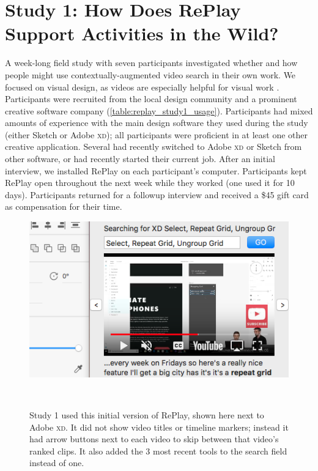 \section{Study 1: How Does RePlay Support Activities in the Wild?}

A week-long field study with seven participants investigated whether and how people might use contextually-augmented video search in their own work. We focused on visual design, as videos are especially helpful for visual work \cite{Chi2012}.  Participants were recruited from the local design community and a prominent creative software company (\autoref{table:replay_study1_usage}). Participants had mixed amounts of experience with the main design software they used during the study (either Sketch or Adobe \textsc{xd}); all participants were proficient in at least one other creative application. Several had recently switched to Adobe \textsc{xd} or Sketch from other software, or had recently started their current job. After an initial interview, we installed RePlay on each participant's computer. Participants kept RePlay open throughout the next week while they worked (one used it for 10 days). Participants returned for a followup interview and received a \$45 gift card as compensation for their time. 

\begin{figure}[b!]
\centering
  \includegraphics[width=.6\textwidth]{replay/figures/replay-old.png}
  \caption{Study 1 used this initial version of RePlay, shown here next to Adobe \textsc{xd}. It did not show video titles or timeline markers; instead it had arrow buttons next to each video to skip between that video's ranked clips. It also added the 3 most recent tools to the search field instead of one. }~\label{fig:replay-old}
\end{figure}

